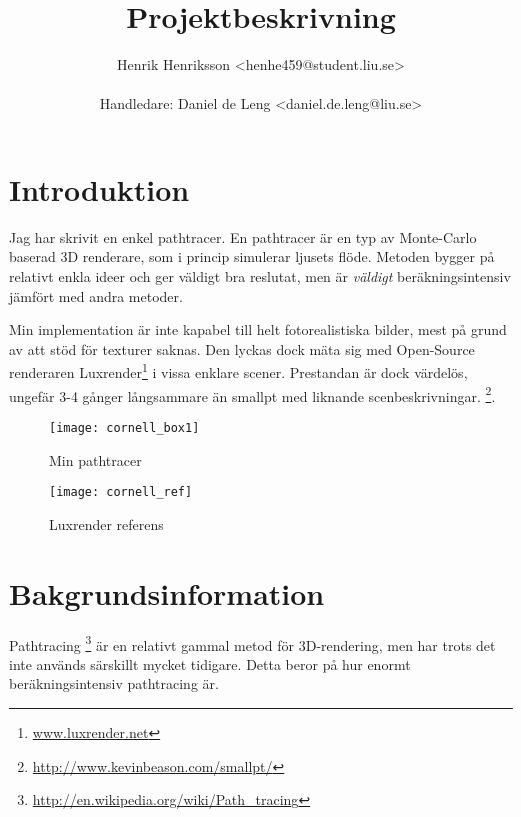\documentclass{article}
\newcommand{\subtitle}[1]{%
  \posttitle{%
    \par\end{center}
    \begin{center}\large#1\end{center}
    \vskip0.5em}%
}
\begin{document}
\title{Projektbeskrivning}
\subtitle{Pathtracer}
\author{Henrik Henriksson <henhe459@student.liu.se> \\\\
Handledare: Daniel de Leng <daniel.de.leng@liu.se>}
\maketitle
\clearpage
\tableofcontents
\clearpage

\section{Introduktion}
Jag har skrivit en enkel pathtracer. En pathtracer är en typ av
Monte-Carlo baserad 3D renderare, som i princip simulerar ljusets
flöde. Metoden bygger på relativt enkla ideer och ger väldigt bra
reslutat, men är \emph{väldigt} beräkningsintensiv jämfört med andra
metoder.

Min implementation är inte kapabel till helt fotorealistiska bilder,
mest på grund av att stöd för texturer saknas. Den lyckas dock mäta
sig med Open-Source renderaren
Luxrender\footnote{\url{www.luxrender.net}} i vissa enklare
scener. Prestandan är dock värdelös, ungefär 3-4 gånger långsammare än
smallpt med liknande scenbeskrivningar.
\footnote{\url{http://www.kevinbeason.com/smallpt/}}.

\begin{figure}
  \begin{center}
  \texttt{[image: cornell\_box1]}
  \end{center}
  \caption{Min pathtracer}
\end{figure}

\begin{figure}
  \begin{center}
  \texttt{[image: cornell\_ref]}
  \end{center}
  \caption{Luxrender referens}
\end{figure}

\section{Bakgrundsinformation}
Pathtracing
\footnote{\url{http://en.wikipedia.org/wiki/Path_tracing}}
 är en relativt gammal metod för 3D-rendering, men har
trots det inte används särskillt mycket tidigare. Detta beror på hur
enormt beräkningsintensiv pathtracing är.
\end{document}
